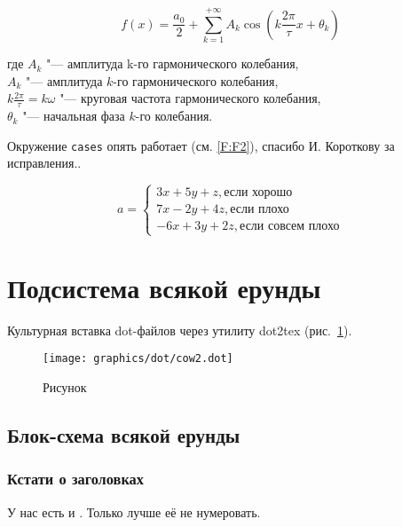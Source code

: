 \begin{eqndesc}
    \begin{equation}\label{eq:fourierrow}
        f(x) = \frac{a_0}{2} + \sum\limits_{k=1}^{+\infty} A_k\cos\left(k\frac{2\pi}{\tau}x+\theta_k\right)
    \end{equation}

    где $A_k$ "--- амплитуда  k-го гармонического колебания,\\
    $A_k$ "--- амплитуда $k$-го гармонического колебания,\\
    $ k\frac{2\pi}{\tau} = k\omega$ "--- круговая частота гармонического колебания,\\
    $\theta_k$ "--- начальная фаза $k$-го колебания.
\end{eqndesc}


Окружение \texttt{cases} опять работает (см. \eqref{F:F2}), спасибо И. Короткову за исправления..


\begin{equation}
a= \begin{cases}
 3x + 5y + z, \mbox{если хорошо} \\
 7x - 2y + 4z, \mbox{если плохо}\\
 -6x + 3y + 2z, \mbox{если совсем плохо}
\end{cases}
\label{F:F2}
\end{equation}

\section{Подсистема всякой ерунды}

Культурная вставка dot-файлов через утилиту dot2tex (рис.~\ref{fig:fig02}).

\begin{figure}
 \centering
 \texttt{[image: graphics/dot/cow2.dot]}
 \caption{Рисунок}
 \label{fig:fig02}
\end{figure}


\subsection{Блок-схема всякой ерунды}

\subsubsection*{Кстати о заголовках}

У нас есть и . Только лучше её не нумеровать.


